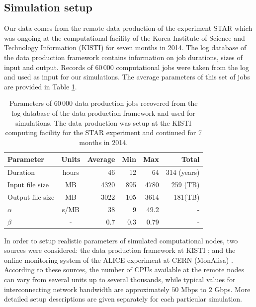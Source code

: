 \documentclass{svjour3}                     %
\begin{document}
\subsection{Simulation setup}
Our data comes from the remote data production of the experiment STAR which was ongoing at the computational facility of the Korea Institute of Science and Technology Information (KISTI)\cite{KISTI} for seven months in 2014. The log database of the data production framework contains information on job durations, sizes of input and output. Records of 60\,000 computational jobs were taken from the log and used as input for our simulations. The average parameters of this set of jobs are provided in Table \ref{tab:jobs}. \begin{table}[b]
\caption{Parameters of 60\,000 data production jobs recovered from the log database of the data production framework and used for simulations. The data production was setup at the KISTI computing facility for the STAR experiment and continued for 7 months in 2014.}
\label{tab:jobs}
\begin{center}
\begin{tabular}{ l  c  r  r  r	|r }
\hline %
  Parameter  & Units& Average & Min & Max & Total \\ \hline %
  Duration & hours & 46 & 12&64&314 (years) \\ 
  Input file size & MB & 4320& 895&4780&259 (TB) \\	
  Output file size & MB & 3022& 105&3614&181(TB) \\
  $\alpha$ & s/MB & 38& 9&49.2&- \\
  $\beta$ & - & 0.7& 0.3& 0.79&-\\	
  \hline %
\end{tabular}
    \end{center}
\end{table}

In order to setup realistic parameters of simulated computational nodes, two sources were considered: the data production framework at KISTI \cite{KISTI-production}; and the online monitoring system of the ALICE experiment at CERN (MonAlisa) \cite{MonAlisa}. According to these sources, the number of CPUs available at the remote nodes can vary from several units up to several thousands, while typical values for interconnecting network bandwidth are approximately $50$ Mbps to $2$ Gbps. More detailed setup descriptions are given separately for each particular simulation. 
\end{document}
